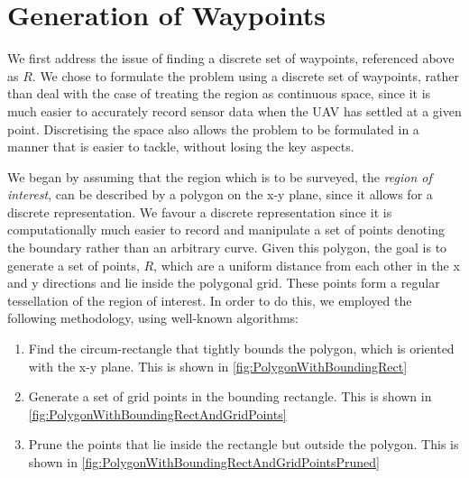 
\section{Generation of Waypoints}
We first address the issue of finding a discrete set of waypoints, referenced above as $R$. We chose to formulate the problem using a discrete set of waypoints, rather than deal with the case of treating the region as continuous space, since it is much easier to accurately record sensor data when the UAV has settled at a given point. Discretising the space also allows the problem to be formulated in a manner that is easier to tackle, without losing the key aspects.


We began by assuming that the region which is to be surveyed, the \textit{region of interest}, can be described by a polygon on the x-y plane, since it allows for a discrete representation. We favour a discrete representation since it is computationally much easier to record and manipulate a set of points denoting the boundary rather than an arbitrary curve. Given this polygon, the goal is to generate a set of points, $R$, which are a uniform distance from each other in the x and y directions and lie inside the polygonal grid. These points form a regular tessellation of the region of interest. In order to do this, we employed the following methodology, using well-known algorithms:
\begin{enumerate}
    \item Find the circum-rectangle that tightly bounds the polygon, which is oriented with the x-y plane. This is shown in \ref{fig:PolygonWithBoundingRect}
    \item Generate a set of grid points in the bounding rectangle. This is shown in \ref{fig:PolygonWithBoundingRectAndGridPoints}
    \item Prune the points that lie inside the rectangle but outside the polygon. This is shown in \ref{fig:PolygonWithBoundingRectAndGridPointsPruned}
\end{enumerate}


